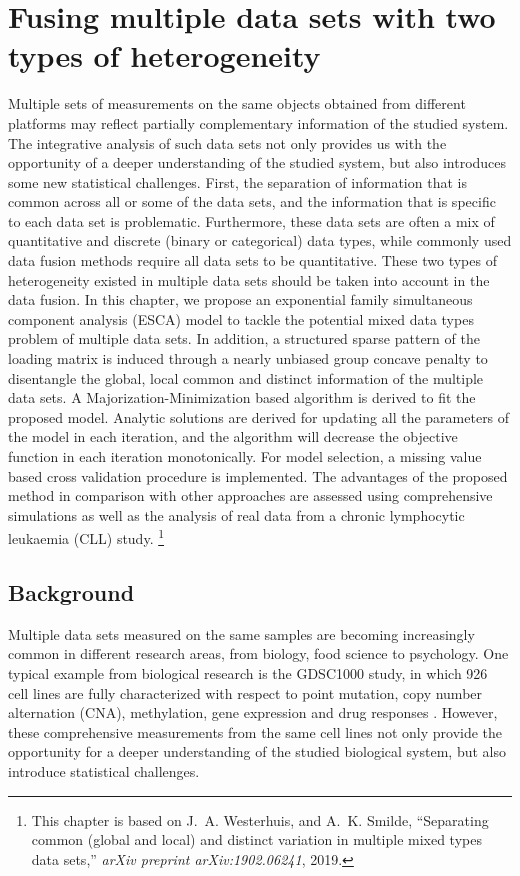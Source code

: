 \chapter{Fusing multiple data sets with two types of heterogeneity} \label{chapter:5}
Multiple sets of measurements on the same objects obtained from different
platforms may reflect partially complementary information of the studied system. The
integrative analysis of such data sets not only provides us with the opportunity of
a deeper understanding of the studied system, but also introduces some new
statistical challenges. First, the separation of information that is common
across all or some of the data sets, and the information that is specific to
each data set is problematic. Furthermore, these data sets are often a mix of
quantitative and discrete (binary or categorical) data types, while commonly used data
fusion methods require all data sets to be quantitative. These two types of heterogeneity existed in multiple data sets should be taken into account in the data fusion. In this chapter, we propose an exponential family simultaneous component analysis (ESCA) model
to tackle the potential mixed data types problem of multiple data sets. In
addition, a structured sparse pattern of the loading matrix is induced through a
nearly unbiased group concave penalty to disentangle the global, local
common and distinct information of the multiple data sets. A Majorization-Minimization based algorithm is derived to fit the proposed model. Analytic solutions are derived for updating all the parameters of the model in each iteration, and the algorithm will decrease the objective function in each iteration monotonically. For model selection, a missing value based cross validation procedure is implemented. The advantages of the proposed method in comparison with other approaches are assessed using comprehensive simulations as well as the analysis of real data from a chronic lymphocytic leukaemia (CLL) study.
\footnote{This chapter is based on J.~A. Westerhuis, and A.~K. Smilde, ``Separating common (global and local) and distinct variation in multiple mixed types data sets,'' {\em arXiv preprint arXiv:1902.06241}, 2019.}

\section{Background} \label{section:5.1}
Multiple data sets measured on the same samples are becoming increasingly common in different research areas, from biology, food science to psychology. One typical example from biological research is the GDSC1000 study, in which 926 cell lines are fully characterized with respect to point mutation, copy number alternation (CNA), methylation, gene expression and drug responses \cite{iorio2016landscape}. However, these comprehensive measurements from the same cell lines not only provide the opportunity for a deeper understanding of the studied biological system, but also introduce statistical challenges.

